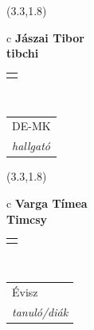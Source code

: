 \documentclass[11pt]{article}
\begin{document}
\makebox(3.3,1.8){
  \renewcommand\arraystretch{1.3}
  \begin{tabular}[c]{c}
    \hspace{8.5mm}
    \LARGE\bf{ Jászai Tibor }\\
    \hspace{8.5mm}
    \Large{ tibchi }\\
    \renewcommand\arraystretch{3}
    \begin{tabular}[c]{c}
      \centering
      \fontfamily{phv}\selectfont{
        \textbf{
          \textsc{
            \scriptsize{
            \color{Dark}{ Ismerkedő }\color{Bright}{ Webmester }\color{Bright}{ Sminkmester }\color{Bright}{ Programozó }
            }
          }
        }
      }
    \end{tabular}
    \\
    \renewcommand\arraystretch{1}
    \begin{tabular}{p{3.3in}}
      \hspace{.7cm}DE-MK\\
      \hspace{.7cm}\emph{ hallgató }\\
    \end{tabular}
  \end{tabular}
}

\makebox(3.3,1.8){
  \renewcommand\arraystretch{1.3}
  \begin{tabular}[c]{c}
    \hspace{8.5mm}
    \LARGE\bf{ Varga Tímea }\\
    \hspace{8.5mm}
    \Large{ Timcsy }\\
    \renewcommand\arraystretch{3}
    \begin{tabular}[c]{c}
      \centering
      \fontfamily{phv}\selectfont{
        \textbf{
          \textsc{
            \scriptsize{
            \color{Dark}{ Ismerkedő }\color{Bright}{ Webmester }\color{Bright}{ Sminkmester }\color{Bright}{ Programozó }
            }
          }
        }
      }
    \end{tabular}
    \\
    \renewcommand\arraystretch{1}
    \begin{tabular}{p{3.3in}}
      \hspace{.7cm}Évisz\\
      \hspace{.7cm}\emph{ tanuló/diák }\\
    \end{tabular}
  \end{tabular}
}
\end{document}
